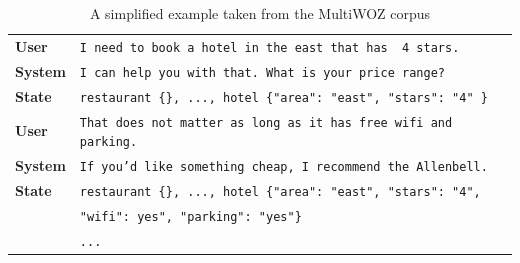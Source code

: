 \begin{table}[h]
    \centering
    \begin{tabular}{l|l}
    \toprule
         \textbf{User} & \texttt{I need to book a hotel in the {\color{cyan!80!yellow!80!black!100 }east} that has { \color{orange!50!yellow!90!black!100!}4 stars.}} \\
         \textbf{System} & \texttt{I can help you with that. What is your price range?} \\
         \textbf{State} & \texttt{restaurant \{\}, ..., hotel \{"area": "{\color{cyan!80!yellow!80!black!100 }east}", "stars": "{\color{orange!50!yellow!90!black!100!}4}" \}} \\
         \textbf{User} & \texttt{That does not matter as long as it has {\color{cyan!80!yellow!80!black!100 }free wifi} and {\color{orange!50!yellow!90!black!100!}parking}.}\\
         \textbf{System} & \texttt{If you'd like something cheap, I recommend the Allenbell.} \\
         \textbf{State} & \texttt{restaurant \{\}, ..., hotel \{"area": "east", "stars": "4",}\\
         & \texttt{"wifi": {\color{cyan!80!yellow!80!black!100}yes}", "parking": "{\color{orange!50!yellow!90!black!100!}yes}"\}} \\
         & \texttt{...} \\
         \bottomrule
    \end{tabular}
    \caption{A simplified example taken from the MultiWOZ corpus}
    \label{02:tab:mw_example}
\end{table}



